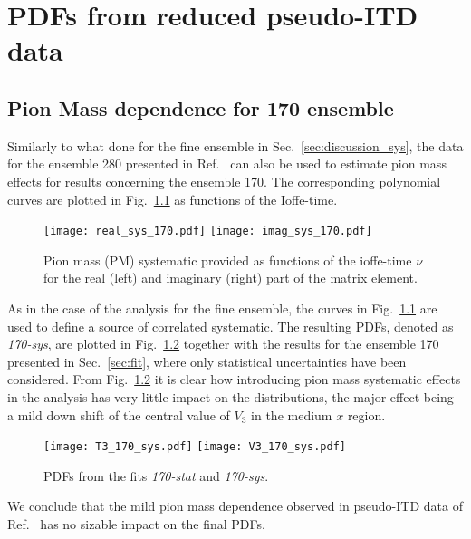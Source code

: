 \chapter{PDFs from reduced pseudo-ITD data}

\section{Pion Mass dependence for 170 ensemble}
Similarly to what done for the fine ensemble in Sec.~\ref{sec:discussion_sys},
the data for the ensemble 280 presented in Ref.~\cite{Joo:2020spy} can also be used to estimate pion mass effects
for results concerning the ensemble 170. The corresponding polynomial curves are plotted in Fig.~\ref{fig:sys_170}
as functions of the Ioffe-time.
\begin{figure}[h!]
    \centering
    \texttt{[image: real\_sys\_170.pdf]}  
    \texttt{[image: imag\_sys\_170.pdf]}
\caption{Pion mass (PM) systematic provided 
as functions of the ioffe-time $\nu$ for the real (left) and imaginary (right) part 
of the matrix element.}
\label{fig:sys_170}
\end{figure}

%
As in the case of the analysis for the fine ensemble, the curves in Fig.~\ref{fig:sys_170} are used 
to define a source of correlated systematic. The resulting PDFs, denoted as \textit{170-sys}, are 
plotted in Fig.~\ref{fig:res_170_sys} together with the results for the ensemble 170 presented in Sec.~\ref{sec:fit},
where only statistical uncertainties have been considered.
From Fig.~\ref{fig:res_170_sys} it is clear how introducing pion mass systematic effects in the analysis has very little impact on
the distributions, the major effect being a mild down shift of the central value of $V_3$ in the medium $x$ region.
\begin{figure}[h!]
    \centering
    \texttt{[image: T3\_170\_sys.pdf]}  
    \texttt{[image: V3\_170\_sys.pdf]}
\caption{PDFs from the fits \textit{170-stat} and \textit{170-sys}.}
\label{fig:res_170_sys}
\end{figure}
We conclude that the mild pion mass dependence observed in pseudo-ITD data of Ref.~\cite{Joo:2020spy} has no sizable impact
on the final PDFs.


